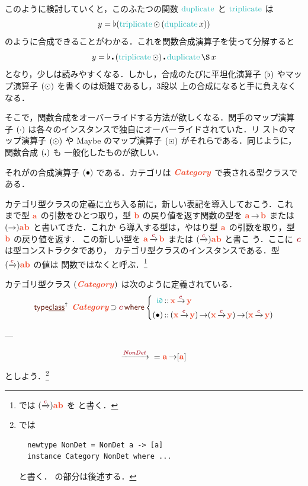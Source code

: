 \documentclass[a5paper,twoside,fleqn,draft]{jsbook}
\begin{document}
このように検討していくと，このふたつの関数 $\mDuplicate$ と
$\mTriplicate$ は
\begin{equation}
  y
  =\mJoinList(\mTriplicate\mMapList{}(\mDuplicate x))
\end{equation}
のように合成できることがわかる．これを関数合成演算子を使って分解すると
\begin{equation}
  \label{eq:triplicate-duplicate}
  y
  =\mJoinList\hCompose{}(\mTriplicate\mMapList)\hCompose\mDuplicate\hApply x
\end{equation}
となり，少しは読みやすくなる．しかし，合成のたびに平坦化演算子
$(\operatorname{\flat})$ やマップ演算子 $(\operatorname{\odot})$ を書くのは煩雑であるし，3段以
上の合成になると手に負えなくなる．

そこで，関数合成をオーバーライドする方法が欲しくなる．関手のマップ演算
子 $(\operatorname{\cdot})$ は各々のインスタンスで独自にオーバーライドされていた．リ
ストのマップ演算子 $(\operatorname{\odot})$ や Maybe のマップ演算子
$(\operatorname{\boxdot})$ がそれらである．同じように，関数合成 $(\operatorname{\centerdot})$ も
一般化したものが欲しい．

それがの合成演算子 $(\operatorname{\bullet})$ である．カテゴリは
$\mCatTypeClass$ で表される型クラスである．

カテゴリ型クラスの定義に立ち入る前に，新しい表記を導入しておこう．これ
まで型 $\mA$ の引数をひとつ取り，型 $\mB$ の戻り値を返す関数の型を
$\mA\mFuncArrow\mB$ または $(\mFuncArrow)\mA\mB$ と書いてきた．これか
ら導入する型は，やはり型 $\mA$ の引数を取り，型 $\mB$ の戻り値を返す．
この新しい型を $\mA\mCatArrowC\mB$ または $(\mCatArrowC)\mA\mB$ と書こ
う．ここに $\mTypeConstructor{c}$ は型コンストラクタであり，
カテゴリ型クラスのインスタンスである．型 $(\mCatArrowC)\mA\mB$ の値は
関数ではなくと呼ぶ．\footnote{\haskell では
  $(\mCatArrowC)\mA\mB$ を  と書く．}

カテゴリ型クラス $(\mCatTypeClass)$ は次のように定義されている．
\begin{equation}
  \mTypeClassDeclPolymorphic\;
  \mCatTypeClass\mSuperSet\mTypeConstructor{c}
  \mWhere\left\{
  \begin{aligned}
    \mIdCat
    &\mIn\mX\mCatArrowC\mY\\
    (\mCompCat)
    &\mIn{}(\mX\mCatArrowC\mY)\mFuncArrow(\mX\mCatArrowC\mY)\mFuncArrow(\mX\mCatArrowC\mY)
  \end{aligned}
  \right.
\end{equation}

---

\begin{equation}
  \mCatArrow{\mTypeConstructor{NonDet}}{}
  =\mA\mFuncArrow[\mA]
\end{equation}
としよう．\footnote{\haskell では
\begin{verbatim}
  newtype NonDet = NonDet a -> [a]
  instance Category NonDet where ...
\end{verbatim}
と書く． の部分は後述する．}
\end{document}

